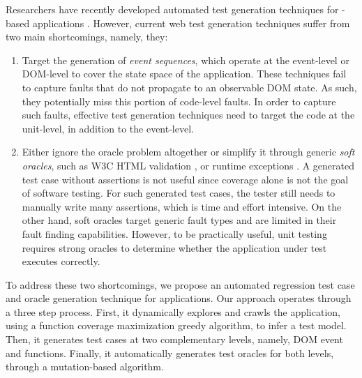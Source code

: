 Researchers have recently developed automated test generation techniques for \javascript-based applications \cite{artzi:icse11, marchetto:search, tonella:icst08, mesbah:tse12, song:symb10}. However, current web test generation techniques suffer from two main  shortcomings, namely, they:

\begin{enumerate}
\item Target the generation of \emph{event sequences}, which operate at the event-level or DOM-level to cover the state space of the application. These techniques fail to capture faults that  do not propagate to an observable DOM state. As such, they potentially miss this portion of code-level \javascript faults. In order to capture such faults, effective test generation techniques need to target the code at the \javascript unit-level, in addition to the event-level.
\item Either ignore the oracle problem altogether or simplify it through generic \emph{soft oracles}, such as  W3C HTML  validation \cite{artzi:icse11,mesbah:tse12}, or  \javascript runtime exceptions \cite{artzi:icse11}.
A generated test case without assertions is not useful since coverage alone is not the goal of software testing. For such generated test cases, the tester still needs to  manually write many assertions, which is time and effort intensive. 
On the other hand, soft oracles  target generic fault types and are limited in their fault finding capabilities.   %
However, to be practically useful, unit testing requires strong oracles  to determine whether the application under test executes correctly.
\end{enumerate}
To address these two shortcomings, we propose an automated regression test case and oracle generation technique for \javascript applications. Our approach operates through a three step process. First, it dynamically explores and crawls the application, using a function coverage maximization greedy algorithm, to infer a test model. Then, it generates test cases at two complementary levels, namely, DOM event and \javascript functions. Finally,   it automatically generates  test oracles for both levels, through a mutation-based algorithm. 
